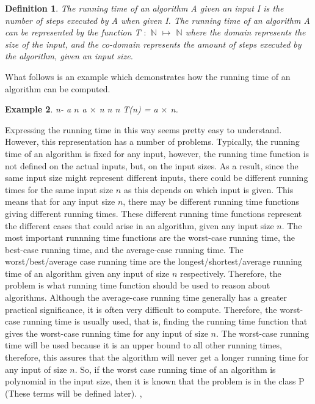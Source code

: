 \documentclass[12pt]{article}
\newtheorem{definition}{Definition}[subsection]
\newtheorem{example}[definition]{Example}
\numberwithin{equation}{subsection}
\numberwithin{table}{subsection}
\numberwithin{algorithm}{subsection}
\numberwithin{figure}{subsection}
\begin{document}
\begin{definition}
\label{running_time}
The running time of an algorithm A given an input I is the number of steps executed by A when given I. The running time of an algorithm A can be represented by the function T $:$ $\mathbb{N}$ $\mapsto$ $\mathbb{N}$ where the domain represents the size of the input, and the co-domain represents the amount of steps executed by the algorithm, given an input size. {}
\end{definition}
What follows is an example which demonstrates how the running time of an algorithm can be computed.
\begin{example}
\label{example_running}
{} n-{{}} a {} $\mathit{n}${} a $\times$ n {} n {} n {} T(n) = a $\times$ n. {}
\end{example}
Expressing the running time in this way seems pretty easy to understand. However, this representation has a number of problems. Typically, the running time of an algorithm is fixed for any input, however, the running time function is not defined on the actual inputs, but, on the input sizes. As a result, since the same input size might represent different inputs, there could be different running times for the same input size $\mathit{n}$ as this depends on which input is given. This means that for any input size $\mathit{n}$, there may be different running time functions giving different running times. These different running time functions represent the different cases that could arise in an algorithm, given any input size $\mathit{n}$. The most important runnning time functions are the worst-case running time, the best-case running time, and the average-case running time. The worst/best/average case running time are the longest/shortest/average running time of an algorithm given any input of size $\mathit{n}$ respectively. Therefore, the problem is what running time function should be used to reason about algorithms. Although the average-case running time generally has a greater practical significance, it is often very difficult to compute. Therefore, the worst-case running time is usually used, that is, finding the running time function that gives the worst-case running time for any input of size $\mathit{n}$. The worst-case running time will be used because it is an upper bound to all other running times, therefore, this assures that the algorithm will never get a longer running time for any input of size $\mathit{n}$. So, if the worst case running time of an algorithm is polynomial in the input size, then it is known that the problem is in the class P (These terms will be defined later).  \cite{cormen_leiserson_rivest_stein}, \cite{adamchik_2009}\\\\
\end{document}
